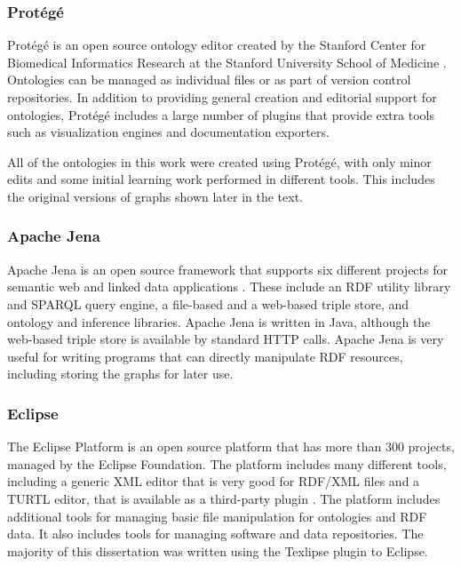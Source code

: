 \subsubsection{Prot\'eg\'e}

Prot\'eg\'e is an open source ontology editor created by the Stanford Center for
Biomedical Informatics Research at the Stanford University School of Medicine
\cite{noauthor_protege_nodate}. Ontologies can be managed as individual files or
as part of version control repositories. In addition to providing general creation and
editorial support for ontologies, Prot\'eg\'e includes a large number of plugins
that provide extra tools such as visualization engines and documentation
exporters.

All of the ontologies in this work were created using Prot\'eg\'e, with only
minor edits and some initial learning work performed in different tools. This
includes the original versions of graphs shown later in the text.

\subsubsection{Apache Jena}

Apache Jena is an open source framework that supports six different projects for
semantic web and linked data applications \cite{noauthor_apache_nodate-1}. These
include an RDF utility library and SPARQL query engine, a file-based and a web-based
triple store, and ontology and inference libraries. Apache Jena is written in
Java, although the web-based triple store is available by standard HTTP calls. 
Apache Jena is very useful for writing programs that can directly manipulate
RDF resources, including storing the graphs for later use.

\subsubsection{Eclipse}

The Eclipse Platform is an open source platform that has more than 300
projects, managed by the Eclipse Foundation. The
platform includes many different tools, including a generic XML editor
that is very good for RDF/XML files and a TURTL editor, that is available as a
third-party plugin \cite{ noauthor_xturtle_nodate}. The platform includes
additional tools for managing basic file manipulation for ontologies and RDF
data. It also includes tools for managing software and data repositories. The
majority of this dissertation was written using the Texlipse plugin to Eclipse.

